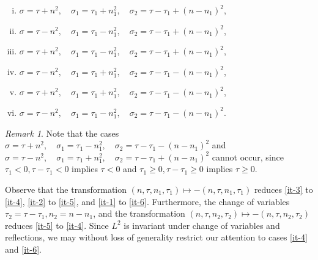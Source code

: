 \documentclass[12pt,reqno]{amsart}
\numberwithin{equation}{section}  %
\numberwithin{figure}{section}
\theoremstyle{plain}
\theoremstyle{definition}
\theoremstyle{remark}
\newtheorem{remark}{Remark}
\begin{document}
\begin{enumerate}[(i)]
    \item $ \sigma=\tau+n^2,\quad \sigma_1=\tau_1+n_1^2,\quad \sigma_2=\tau -
      \tau_1+(n - n_1)^2$,
\label{it-1}
    \item $ \sigma=\tau-n^2,\quad \sigma_1=\tau_1-n_1^2,\quad \sigma_2=\tau - \tau_1+(n - n_1)^2$,
\label{it-2}
    \item  $\sigma=\tau+n^2,\quad \sigma_1=\tau_1-n_1^2,\quad \sigma_2=\tau - \tau_1+(n - n_1)^2$,
      \label{it-3}
    \item $\sigma=\tau-n^2,\quad \sigma_1=\tau_1+n_1^2,\quad \sigma_2=\tau - \tau_1-(n - n_1)^2$,
\label{it-4}
    \item $\sigma=\tau+n^2,\quad \sigma_1=\tau_1+n_1^2,\quad \sigma_2=\tau - \tau_1-(n - n_1)^2$,
\label{it-5}
    \item $\sigma=\tau-n^2,\quad \sigma_1=\tau_1-n_1^2,\quad \sigma_2=\tau - \tau_1-(n - n_1)^2$.
\label{it-6}
\end{enumerate}
%
%
\begin{framed}
\begin{remark}
Note that the cases $\sigma=\tau+n^2,\quad \sigma_1=\tau_1-n_1^2,\quad
\sigma_2=\tau - \tau_1-(n - n_1)^2$ and $\sigma=\tau-n^2,\quad
\sigma_1=\tau_1+n_1^2,\quad \sigma_2=\tau - \tau_1+(n - n_1)^2$ cannot occur, since
$\tau_1< 0, \tau-\tau_1< 0$ implies $\tau<0$ and $\tau_1\geq 0, \tau-\tau_1\geq
0$ implies $\tau\geq 0$.
\end{remark}
\end{framed}
%
Observe that the transformation $(n, \tau, n_{1}, \tau_{1}) \mapsto -(n, \tau,
n_{1}, \tau_{1})$ reduces \eqref{it-3} to \eqref{it-4}, \eqref{it-2} to
\eqref{it-5}, and \eqref{it-1} to \eqref{it-6}. Furthermore, the change of
variables $\tau_{2} = \tau - \tau_{1}, n_{2} = n - n_{1}$, and the
transformation $(n, \tau, n_{2}, \tau_{2}) \mapsto - (n, \tau, n_{2},
\tau_{2})$ reduces \eqref{it-5} to \eqref{it-4}. Since $L^{2}$ is invariant
under change of variables and reflections, we may without loss of generality
restrict our attention to cases \eqref{it-4} and \eqref{it-6}.
\end{document}
